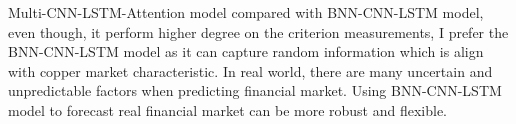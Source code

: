 \documentclass[final-report]{report-template}
\begin{document}
Multi-CNN-LSTM-Attention model compared with BNN-CNN-LSTM model, even though, it perform higher degree on the criterion measurements, I prefer the BNN-CNN-LSTM model as it can capture random information which is align with copper market characteristic. In real world, there are many uncertain and unpredictable factors when predicting financial market. Using BNN-CNN-LSTM model to forecast real financial market can be more robust and flexible. 
\newpage


\end{document}
